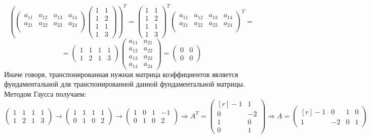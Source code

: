 \begin{equation*}\left(
\begin{pmatrix*}
a_{11}&a_{12}&a_{13}&a_{14}\\
a_{21}&a_{22}&a_{23}&a_{24}\\
\end{pmatrix*}\begin{pmatrix*}
1&1\\
1&2\\
1&1\\
1&3
\end{pmatrix*}\right)^{T}=\begin{pmatrix*}
1&1\\
1&2\\
1&1\\
1&3
\end{pmatrix*}^{T}
    \begin{pmatrix*}
a_{11}&a_{12}&a_{13}&a_{14}\\
a_{21}&a_{22}&a_{23}&a_{24}\\
\end{pmatrix*}^{T}=
\end{equation*}
\begin{equation}
=\begin{pmatrix*}
1&1&1&1\\
1&2&1&3
\end{pmatrix*}\begin{pmatrix*}
a_{11}&a_{21}\\
a_{12}&a_{22}\\
a_{13}&a_{23}\\
a_{14}&a_{24}
\end{pmatrix*}
=\begin{pmatrix*}
0&0\\
0&0
\end{pmatrix*}
\label{eqn:SOLE2}
\end{equation}
Иначе говоря, транспонированная нужная матрица коэффициентов является фундаментальной для транспонированной данной фундаментальной матрицы.\\
Методом Гаусса получаем:
\begin{equation}
\begin{pmatrix*}
1&1&1&1\\
1&2&1&3
\end{pmatrix*}\rightarrow\begin{pmatrix*}
1&1&1&1\\
0&1&0&2
\end{pmatrix*}\rightarrow\begin{pmatrix*}
1&0&1&-1\\
0&1&0&2
\end{pmatrix*}\Rightarrow A^{T}=\begin{pmatrix*}[r]
-1&1\\
0&-2\\
1&0\\
0&1
\end{pmatrix*}\Rightarrow A=\begin{pmatrix*}[r]
-1&0&1&0\\
1&-2&0&1
\end{pmatrix*}
\label{eqn:SOLE3}
\end{equation}
